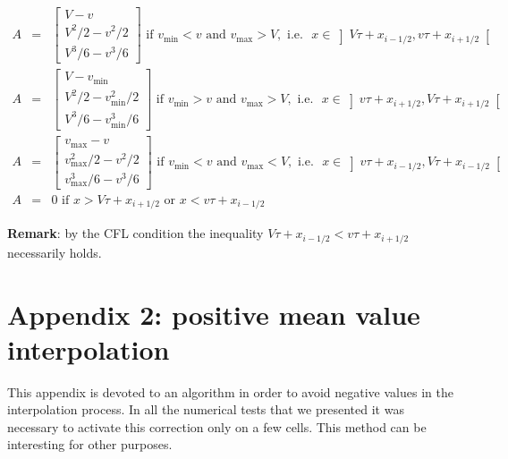 \documentclass{fldauth}
\theoremstyle{plain}
\theoremstyle{plain}
\theoremstyle{plain}
\theoremstyle{plain}
\theoremstyle{plain}
\theoremstyle{plain}
\begin{document}
\begin{eqnarray*}
A & = & \left[ \begin{array}{c}
V-v\\
V^{2}/2-v^{2}/2\\
V^{3}/6-v^{3}/6
\end{array}\right] \textrm{ if }v_{\min }<v\textrm{ and }v_{\max }>V,\textrm{ i}.\textrm{e}.\textrm{ }x\in \left] V\tau +x_{i-1/2},v\tau +x_{i+1/2}\right[ \\
A & = & \left[ \begin{array}{c}
V-v_{\min }\\
V^{2}/2-v_{\min }^{2}/2\\
V^{3}/6-v_{\min }^{3}/6
\end{array}\right] \textrm{ if }v_{\min }>v\textrm{ and }v_{\max }>V,\textrm{ i}.\textrm{e}.\textrm{ }x\in \left] v\tau +x_{i+1/2},V\tau +x_{i+1/2}\right[ \\
A & = & \left[ \begin{array}{c}
v_{\max }-v\\
v_{\max }^{2}/2-v^{2}/2\\
v_{\max }^{3}/6-v^{3}/6
\end{array}\right] \textrm{ if }v_{\min }<v\textrm{ and }v_{\max }<V,\textrm{ i}.\textrm{e}.\textrm{ }x\in \left] v\tau +x_{i-1/2},V\tau +x_{i-1/2}\right[ \\
A & = & 0\textrm{ if }x>V\tau +x_{i+1/2}\textrm{ or }x<v\tau +x_{i-1/2}
\end{eqnarray*}


\textbf{Remark}: by the CFL condition the inequality \( V\tau +x_{i-1/2}<v\tau +x_{i+1/2} \)
necessarily holds.
\section*{Appendix 2: positive mean value interpolation}
This appendix is devoted to an algorithm in order to avoid
negative values in the interpolation process. In all the numerical
tests that we presented it was necessary to activate this
correction only on a few cells. This method can be interesting for
other purposes.
\end{document}
